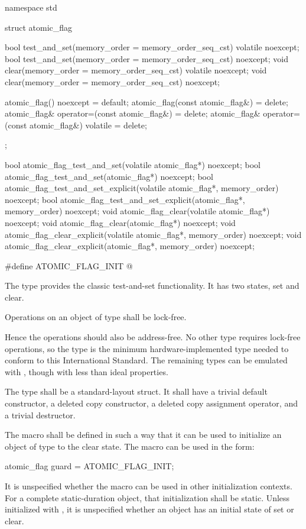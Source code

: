 \begin{codeblock}
namespace std {
  struct atomic_flag {
    bool test_and_set(memory_order = memory_order_seq_cst) volatile noexcept;
    bool test_and_set(memory_order = memory_order_seq_cst) noexcept;
    void clear(memory_order = memory_order_seq_cst) volatile noexcept;
    void clear(memory_order = memory_order_seq_cst) noexcept;

    atomic_flag() noexcept = default;
    atomic_flag(const atomic_flag&) = delete;
    atomic_flag& operator=(const atomic_flag&) = delete;
    atomic_flag& operator=(const atomic_flag&) volatile = delete;
  };

  bool atomic_flag_test_and_set(volatile atomic_flag*) noexcept;
  bool atomic_flag_test_and_set(atomic_flag*) noexcept;
  bool atomic_flag_test_and_set_explicit(volatile atomic_flag*, memory_order) noexcept;
  bool atomic_flag_test_and_set_explicit(atomic_flag*, memory_order) noexcept;
  void atomic_flag_clear(volatile atomic_flag*) noexcept;
  void atomic_flag_clear(atomic_flag*) noexcept;
  void atomic_flag_clear_explicit(volatile atomic_flag*, memory_order) noexcept;
  void atomic_flag_clear_explicit(atomic_flag*, memory_order) noexcept;

  #define ATOMIC_FLAG_INIT @\seebelow@
}
\end{codeblock}

\pnum
The  type provides the classic test-and-set functionality. It has two states, set and clear.

\pnum
Operations on an object of type  shall be lock-free. \begin{note} Hence
the operations should also be address-free. No other type requires lock-free operations,
so the  type is the minimum hardware-implemented type needed to
conform to this International Standard. The remaining types can be emulated with
, though with less than ideal properties. \end{note}

\pnum
The  type shall be a standard-layout struct.
It shall have a trivial default constructor, a deleted copy constructor, a deleted copy assignment operator, and a trivial destructor.

\pnum
The macro  shall be defined in such a way that it can be used to initialize an object of type  to the
clear state. The macro can be used in the form:
\begin{codeblock}
atomic_flag guard = ATOMIC_FLAG_INIT;
\end{codeblock}
It is unspecified whether the macro can be used in other initialization contexts.
For a complete static-duration object, that initialization shall be static.
Unless initialized with , it is unspecified whether an
 object has an initial state of set or clear.

